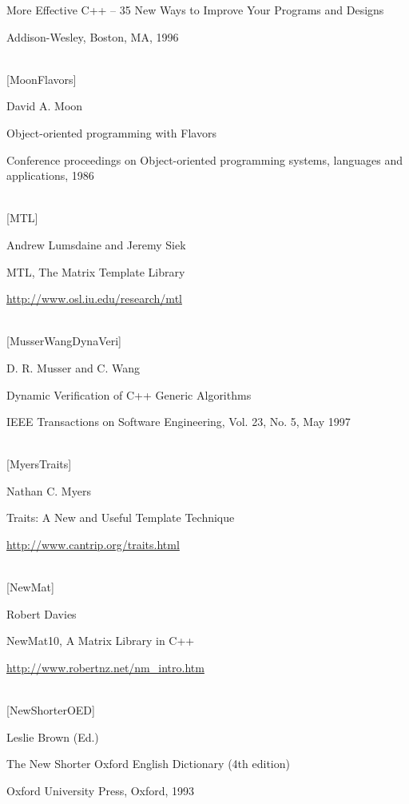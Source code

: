 More Effective C++ – 35 New Ways to Improve Your Programs and Designs

Addison-Wesley, Boston, MA, 1996


\hspace*{\fill} \\ %
{[MoonFlavors]}

David A. Moon

Object-oriented programming with Flavors

Conference proceedings on Object-oriented programming systems, languages and applications, 1986


\hspace*{\fill} \\ %
{[MTL]}

Andrew Lumsdaine and Jeremy Siek

MTL, The Matrix Template Library

\url{http://www.osl.iu.edu/research/mtl}


\hspace*{\fill} \\ %
{[MusserWangDynaVeri]}

D. R. Musser and C. Wang

Dynamic Verification of C++ Generic Algorithms

IEEE Transactions on Software Engineering, Vol. 23, No. 5, May 1997

\hspace*{\fill} \\ %
{[MyersTraits]}

Nathan C. Myers

Traits: A New and Useful Template Technique

\url{http://www.cantrip.org/traits.html}


\hspace*{\fill} \\ %
{[NewMat]}

Robert Davies

NewMat10, A Matrix Library in C++

\url{http://www.robertnz.net/nm_intro.htm}


\hspace*{\fill} \\ %
{[NewShorterOED]}

Leslie Brown (Ed.)

The New Shorter Oxford English Dictionary (4th edition)

Oxford University Press, Oxford, 1993


